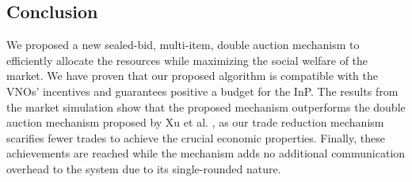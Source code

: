 



\subsection{Conclusion} \label{Mcaffe:conclution}
We proposed a new sealed-bid, multi-item, double auction mechanism to efficiently allocate the resources while maximizing the social welfare of the market. We have proven that our proposed algorithm is compatible with the VNOs' incentives and guarantees positive a budget for the InP. The results from the market simulation show that the proposed mechanism outperforms the double auction mechanism proposed by Xu et al. \cite{5462277}, as our trade reduction mechanism scarifies fewer trades to achieve the crucial economic properties. Finally, these achievements are reached while the mechanism adds no additional communication overhead to the system due to its single-rounded nature.
